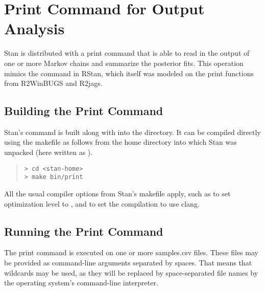 \chapter{Print Command for Output Analysis}\label{print-command.chapter}

Stan is distributed with a print command that is able to read in the
output of one or more Markov chains and summarize the posterior fits.
This operation mimics the  command in RStan, which
itself was modeled on the print functions from R2WinBUGS and R2jags.

\section{Building the Print Command}

Stan's  command is built along with  into the
 directory.  It can be compiled directly using the makefile
as follows from the home directory into which Stan was unpacked (here
written as ).
%
\begin{quote}
\begin{Verbatim}[fontsize=\small]
> cd <stan-home>
> make bin/print
\end{Verbatim}
\end{quote}
%
All the usual compiler options from Stan's makefile apply, such as
 to set optimization level to , and
 to set the compilation to use clang. 

\section{Running the Print Command}

The print command is executed on one or more samples.csv files.  These
files may be provided as command-line arguments separated by spaces.
That means that wildcards may be used, as they will be replaced by
space-separated file names by the operating system's command-line
interpreter. 

